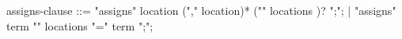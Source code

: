 \begin{syntax}
assigns-clause ::= "assigns" location ("," location)* ("\from" locations )? ";";
                 | "assigns" term "\from" locations {"=" term ";"};
\end{syntax}